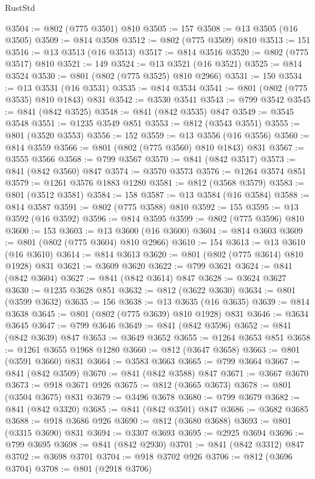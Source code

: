 \begin{lexlean}{RustStd}
\begin{coremodule}
@3504 := @802 (@775 @3501) @810
@3505 := 157
@3508 := @13 @3505 (@16 @3505)
@3509 := @814 @3508
@3512 := @802 (@775 @3509) @810
@3513 := 151
@3516 := @13 @3513 (@16 @3513)
@3517 := @814 @3516
@3520 := @802 (@775 @3517) @810
@3521 := 149
@3524 := @13 @3521 (@16 @3521)
@3525 := @814 @3524
@3530 := @801 (@802 (@775 @3525) @810 @2966)
@3531 := 150
@3534 := @13 @3531 (@16 @3531)
@3535 := @814 @3534
@3541 := @801 (@802 (@775 @3535) @810 @1843) @831
@3542 := @3530 @3541
@3543 := @799 @3542
@3545 := @841 (@842 @3525)
@3548 := @841 (@842 @3535) @847
@3549 := @3545 @3548
@3551 := @1235 @3549 @851
@3553 := @812 (@3543 @3551)
@3555 := @801 (@3520 @3553)
@3556 := 152
@3559 := @13 @3556 (@16 @3556)
@3560 := @814 @3559
@3566 := @801 (@802 (@775 @3560) @810 @1843) @831
@3567 := @3555 @3566
@3568 := @799 @3567
@3570 := @841 (@842 @3517)
@3573 := @841 (@842 @3560) @847
@3574 := @3570 @3573
@3576 := @1264 @3574 @851
@3579 := @1261 @3576 @1883 @1280
@3581 := @812 (@3568 @3579)
@3583 := @801 (@3512 @3581)
@3584 := 158
@3587 := @13 @3584 (@16 @3584)
@3588 := @814 @3587
@3591 := @802 (@775 @3588) @810
@3592 := 155
@3595 := @13 @3592 (@16 @3592)
@3596 := @814 @3595
@3599 := @802 (@775 @3596) @810
@3600 := 153
@3603 := @13 @3600 (@16 @3600)
@3604 := @814 @3603
@3609 := @801 (@802 (@775 @3604) @810 @2966)
@3610 := 154
@3613 := @13 @3610 (@16 @3610)
@3614 := @814 @3613
@3620 := @801 (@802 (@775 @3614) @810 @1928) @831
@3621 := @3609 @3620
@3622 := @799 @3621
@3624 := @841 (@842 @3604)
@3627 := @841 (@842 @3614) @847
@3628 := @3624 @3627
@3630 := @1235 @3628 @851
@3632 := @812 (@3622 @3630)
@3634 := @801 (@3599 @3632)
@3635 := 156
@3638 := @13 @3635 (@16 @3635)
@3639 := @814 @3638
@3645 := @801 (@802 (@775 @3639) @810 @1928) @831
@3646 := @3634 @3645
@3647 := @799 @3646
@3649 := @841 (@842 @3596)
@3652 := @841 (@842 @3639) @847
@3653 := @3649 @3652
@3655 := @1264 @3653 @851
@3658 := @1261 @3655 @1968 @1280
@3660 := @812 (@3647 @3658)
@3663 := @801 (@3591 @3660) @831
@3664 := @3583 @3663
@3665 := @799 @3664
@3667 := @841 (@842 @3509)
@3670 := @841 (@842 @3588) @847
@3671 := @3667 @3670
@3673 := @918 @3671 @926
@3675 := @812 (@3665 @3673)
@3678 := @801 (@3504 @3675) @831
@3679 := @3496 @3678
@3680 := @799 @3679
@3682 := @841 (@842 @3320)
@3685 := @841 (@842 @3501) @847
@3686 := @3682 @3685
@3688 := @918 @3686 @926
@3690 := @812 (@3680 @3688)
@3693 := @801 (@3315 @3690) @831
@3694 := @3307 @3693
@3695 := @2925 @3694
@3696 := @799 @3695
@3698 := @841 (@842 @2930)
@3701 := @841 (@842 @3312) @847
@3702 := @3698 @3701
@3704 := @918 @3702 @926
@3706 := @812 (@3696 @3704)
@3708 := @801 (@2918 @3706)

\end{coremodule}
\end{lexlean}
